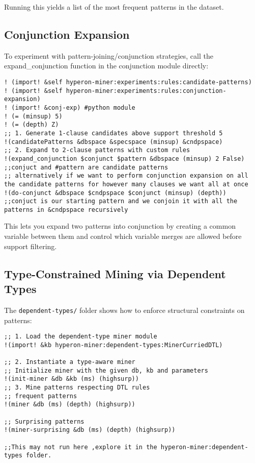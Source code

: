 \documentclass{article}
\begin{document}
Running this yields a list of the most frequent patterns in the dataset.

\subsection{Conjunction Expansion}

To experiment with pattern-joining/conjunction strategies, call the expand_conjunction function in the conjunction module directly:

\begin{verbatim}
! (import! &self hyperon-miner:experiments:rules:candidate-patterns)
! (import! &self hyperon-miner:experiments:rules:conjunction-expansion)
! (import! &conj-exp) #python module 
! (= (minsup) 5)
! (= (depth) Z)
;; 1. Generate 1-clause candidates above support threshold 5
!(candidatePatterns &dbspace &specspace (minsup) &cndpspace)
;; 2. Expand to 2-clause patterns with custom rules
!(expand_conjunction $conjunct $pattern &dbspace (minsup) 2 False) 
;;conjuct and #pattern are candidate patterns
;; alternatively if we want to perform conjunction expansion on all the candidate patterns for however many clauses we want all at once
!(do-conjunct &dbspace $cndpspace $conjunct (minsup) (depth)) 
;;conjuct is our starting pattern and we conjoin it with all the patterns in &cndpspace recursively
\end{verbatim}

This lets you expand two patterns into conjunction by creating a common variable between them and control which variable merges are allowed before support filtering.

\subsection{Type-Constrained Mining via Dependent Types}

The \texttt{dependent-types/} folder shows how to enforce structural constraints on patterns:

\begin{verbatim}
;; 1. Load the dependent-type miner module
!(import! &kb hyperon-miner:dependent-types:MinerCurriedDTL)

;; 2. Instantiate a type-aware miner
;; Initialize miner with the given db, kb and parameters
!(init-miner &db &kb (ms) (highsurp))
;; 3. Mine patterns respecting DTL rules
;; frequent patterns 
!(miner &db (ms) (depth) (highsurp))

;; Surprising patterns
!(miner-surprising &db (ms) (depth) (highsurp))

;;This may not run here ,explore it in the hyperon-miner:dependent-types folder.
\end{verbatim}
\end{document}
